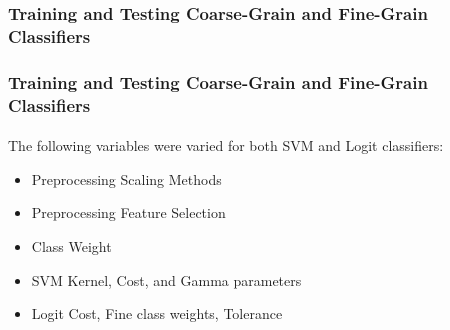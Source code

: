 \documentclass{beamer}
\begin{document}
\begin{frame}
    \frametitle{Training and Testing Coarse-Grain and Fine-Grain Classifiers}
    \framesubtitle{}
    \begin{table}[H]
      \centering
        \caption{Number of proteins in each partition:}
        \label{tab:partitions}
    \end{table}
\end{frame}
\begin{frame}
    \frametitle{Training and Testing Coarse-Grain and Fine-Grain Classifiers}
    \framesubtitle{}
     \par The following variables were varied for both SVM and Logit classifiers:
    \begin{itemize}
      \item Preprocessing Scaling Methods
      \item Preprocessing Feature Selection
      \item Class Weight
      \item SVM Kernel, Cost, and Gamma parameters
      \item Logit Cost, Fine class weights, Tolerance
    \end{itemize}
\end{frame}
\end{document}
